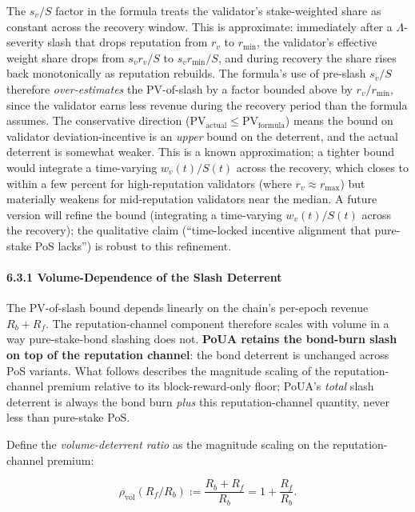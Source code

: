 \documentclass[
  11pt,
]{article}
\begin{document}
The \(s_v / S\) factor in the formula treats the validator's
stake-weighted share as constant across the recovery window. This is
approximate: immediately after a \(\Lambda\)-severity slash that drops
reputation from \(r_v\) to \(r_{\min}\), the validator's effective
weight share drops from \(s_v r_v / S\) to \(s_v r_{\min} / S\), and
during recovery the share rises back monotonically as reputation
rebuilds. The formula's use of pre-slash \(s_v / S\) therefore
\emph{over-estimates} the PV-of-slash by a factor bounded above by
\(r_v / r_{\min}\), since the validator earns less revenue during the
recovery period than the formula assumes. The conservative direction
(\(\text{PV}_{\text{actual}} \leq \text{PV}_{\text{formula}}\)) means
the bound on validator deviation-incentive is an \emph{upper} bound on
the deterrent, and the actual deterrent is somewhat weaker. This is a
known approximation; a tighter bound would integrate a time-varying
\(w_v(t)/S(t)\) across the recovery, which closes to within a few
percent for high-reputation validators (where \(r_v \approx r_{\max}\))
but materially weakens for mid-reputation validators near the median. A
future version will refine the bound (integrating a time-varying
\(w_v(t)/S(t)\) across the recovery); the qualitative claim
(``time-locked incentive alignment that pure-stake PoS lacks'') is
robust to this refinement.

\paragraph{6.3.1 Volume-Dependence of the Slash
Deterrent}\label{volume-dependence-of-the-slash-deterrent}

The PV-of-slash bound depends linearly on the chain's per-epoch revenue
\(R_b + R_f\). The reputation-channel component therefore scales with
volume in a way pure-stake-bond slashing does not. \textbf{PoUA retains
the bond-burn slash on top of the reputation channel}: the bond
deterrent is unchanged across PoS variants. What follows describes the
magnitude scaling of the reputation-channel premium relative to its
block-reward-only floor; PoUA's \emph{total} slash deterrent is always
the bond burn \emph{plus} this reputation-channel quantity, never less
than pure-stake PoS.

Define the \emph{volume-deterrent ratio} as the magnitude scaling on the
reputation-channel premium:

\[\rho_{\text{vol}}(R_f / R_b) := \frac{R_b + R_f}{R_b} = 1 + \frac{R_f}{R_b}.\]
\end{document}
